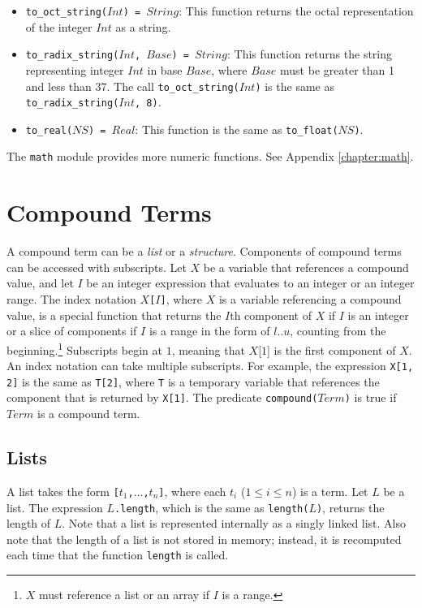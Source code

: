 \begin{itemize}
\item \texttt{to\_oct\_string($Int$) = $String$}:  This function returns the octal representation of the integer $Int$ as a string.
\item \texttt{to\_radix\_string($Int$, $Base$) = $String$}:  This function returns the string representing integer $Int$ in base $Base$, where $Base$ must be greater than 1 and less than 37. The call \texttt{to\_oct\_string($Int$)} is the same as \texttt{to\_radix\_string($Int$, 8)}.
\item \texttt{to\_real($NS$) = $Real$}: This function is the same as \texttt{to\_float($NS$)}.
\end{itemize}
The \texttt{math} module provides more numeric functions.  See Appendix \ref{chapter:math}.

\section{Compound Terms}
A compound term can be a \emph{list} or a \emph{structure}. Components of compound terms can be accessed with subscripts. Let $X$ be a variable that references a compound value, and let $I$ be an integer expression that evaluates to an integer or an integer range. The index notation \texttt{$X$[$I$]}, where $X$ is a variable referencing a compound value, is a special function that returns the $I$th component of $X$ if $I$ is an integer or a slice of components if $I$ is a range in the form of $l..u$, counting from the beginning.\footnote{$X$ must reference a list or an array if $I$ is a range.} Subscripts begin at $1$, meaning that $X$[$1$] is the first component of $X$. An index notation can take multiple subscripts. For example, the expression \texttt{X[1, 2]} is the same as \texttt{T[2]}, where \texttt{T} is a temporary variable that references the component that is returned by \texttt{X[1]}. The predicate \texttt{compound($Term$)} is true if $Term$ is a compound term.

\subsection{\label{subsec:lists}Lists}
A list takes the form \texttt{[$t_1$,$\ldots$,$t_{n}$]}, where each $t_i$ ($1\le i \le n$) is a term. Let $L$ be a list. The expression \texttt{$L$.length}, which is the same as \texttt{length($L$)}, returns the length of $L$. Note that a list is represented internally as a singly linked list.  Also note that the length of a list is not stored in memory; instead, it is recomputed each time that the function \texttt{length} is called.

